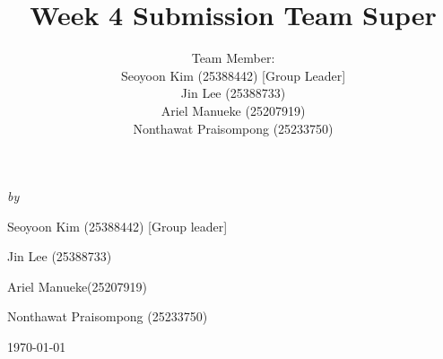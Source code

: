 \documentclass[12pt,a4paper]{article}
\begin{document}
\begin{titlepage}
\emph{by} \\[1ex]
{ Seoyoon Kim (25388442) [Group leader] \\ \par} %
{ Jin Lee (25388733)  \\ \par} %
{ Ariel Manueke(25207919) \\ \par} %
{ Nonthawat Praisompong (25233750) \\ \par} %

	
	
	
	\vfill\vfill\vfill %
	
	{\large\today} %
	
	
	 
	
	\vfill %
	
\end{titlepage}


\newpage
\title{Week 4 Submission Team Super}
\author{
  Team Member:\\
  Seoyoon Kim (25388442) [Group Leader]\\
  Jin Lee (25388733)\\
  Ariel Manueke (25207919)\\
  Nonthawat Praisompong (25233750)
}
\date{}
\end{document}
